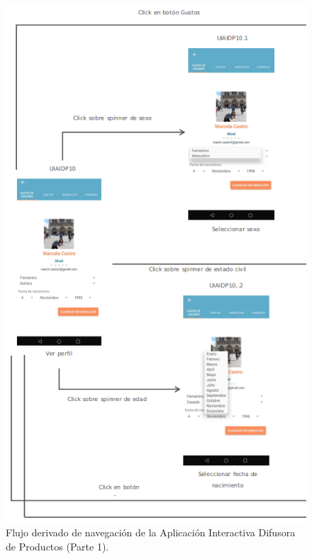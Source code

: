 \FloatBarrier
\begin{figure}[htbp!]
		\centering
			\includegraphics[width=.7 \textwidth]{imagenes/mapaNav2NuevoP1}
		\caption{Flujo derivado de navegación de la Aplicación Interactiva Difusora de Productos (Parte 1).}
		\label{image:map5}
\end{figure}
\FloatBarrier

